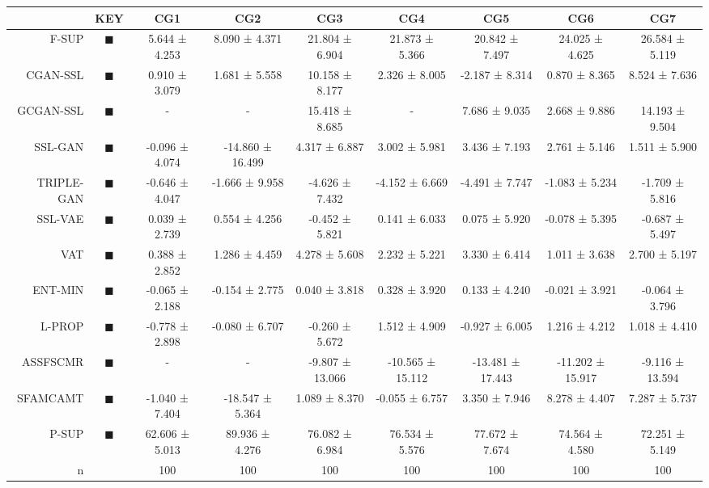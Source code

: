 \begin{tabular}{rcccccccc}
\toprule
 & KEY & CG1 & CG2 & CG3 & CG4 & CG5 & CG6 & CG7 \\
\midrule
F-SUP & \textcolor{FULLY_SUPERVISED_CLASSIFIER}{\LARGE $\blacksquare$} & 5.644 ± 4.253 & 8.090 ± 4.371 & 21.804 ± 6.904 & 21.873 ± 5.366 & 20.842 ± 7.497 & 24.025 ± 4.625 & 26.584 ± 5.119 \\
CGAN-SSL & \textcolor{CGAN_BASIC_DJ_SUPERVISED_CLASSIFIER}{\LARGE $\blacksquare$} & 0.910 ± 3.079 & 1.681 ± 5.558 & 10.158 ± 8.177 & 2.326 ± 8.005 & -2.187 ± 8.314 & 0.870 ± 8.365 & 8.524 ± 7.636 \\
GCGAN-SSL & \textcolor{CGAN_GUMBEL_DJ_SUPERVISED_CLASSIFIER}{\LARGE $\blacksquare$} & - & - & 15.418 ± 8.685 & - & 7.686 ± 9.035 & 2.668 ± 9.886 & 14.193 ± 9.504 \\
SSL-GAN & \textcolor{SSL_GAN}{\LARGE $\blacksquare$} & -0.096 ± 4.074 & -14.860 ± 16.499 & 4.317 ± 6.887 & 3.002 ± 5.981 & 3.436 ± 7.193 & 2.761 ± 5.146 & 1.511 ± 5.900 \\
TRIPLE-GAN & \textcolor{TRIPLE_GAN}{\LARGE $\blacksquare$} & -0.646 ± 4.047 & -1.666 ± 9.958 & -4.626 ± 7.432 & -4.152 ± 6.669 & -4.491 ± 7.747 & -1.083 ± 5.234 & -1.709 ± 5.816 \\
SSL-VAE & \textcolor{SSL_VAE}{\LARGE $\blacksquare$} & 0.039 ± 2.739 & 0.554 ± 4.256 & -0.452 ± 5.821 & 0.141 ± 6.033 & 0.075 ± 5.920 & -0.078 ± 5.395 & -0.687 ± 5.497 \\
VAT & \textcolor{VAT}{\LARGE $\blacksquare$} & 0.388 ± 2.852 & 1.286 ± 4.459 & 4.278 ± 5.608 & 2.232 ± 5.221 & 3.330 ± 6.414 & 1.011 ± 3.638 & 2.700 ± 5.197 \\
ENT-MIN & \textcolor{ENTROPY_MINIMISATION}{\LARGE $\blacksquare$} & -0.065 ± 2.188 & -0.154 ± 2.775 & 0.040 ± 3.818 & 0.328 ± 3.920 & 0.133 ± 4.240 & -0.021 ± 3.921 & -0.064 ± 3.796 \\
L-PROP & \textcolor{LABEL_PROPAGATION}{\LARGE $\blacksquare$} & -0.778 ± 2.898 & -0.080 ± 6.707 & -0.260 ± 5.672 & 1.512 ± 4.909 & -0.927 ± 6.005 & 1.216 ± 4.212 & 1.018 ± 4.410 \\
ASSFSCMR & \textcolor{ASSFSCMR}{\LARGE $\blacksquare$} & - & - & -9.807 ± 13.066 & -10.565 ± 15.112 & -13.481 ± 17.443 & -11.202 ± 15.917 & -9.116 ± 13.594 \\
SFAMCAMT & \textcolor{SFAMCAMT}{\LARGE $\blacksquare$} & -1.040 ± 7.404 & -18.547 ± 5.364 & 1.089 ± 8.370 & -0.055 ± 6.757 & 3.350 ± 7.946 & 8.278 ± 4.407 & 7.287 ± 5.737 \\
P-SUP & \textcolor{PARTIAL_SUPERVISED_CLASSIFIER}{\LARGE $\blacksquare$} & 62.606 ± 5.013 & 89.936 ± 4.276 & 76.082 ± 6.984 & 76.534 ± 5.576 & 77.672 ± 7.674 & 74.564 ± 4.580 & 72.251 ± 5.149 \\
n &  & 100 & 100 & 100 & 100 & 100 & 100 & 100 \\
\bottomrule
\end{tabular}
